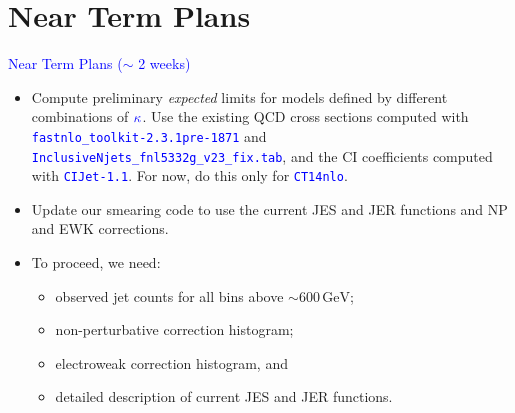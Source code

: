 \documentclass[t,professionalfonts,handout, xcolor=pdftex,dvipsnames,table]{beamer}
\newcommand{\bkappa}{\textcolor{blue}{\kappa}}
\begin{document}
\section{Near Term Plans}
\begin{frame}
\textcolor{blue}{Near Term Plans ($\sim$ 2 weeks)}
\begin{itemize}
\item Compute preliminary \emph{expected} limits for models defined by different combinations of $\bkappa$.
Use the existing QCD cross sections computed with
\textcolor{blue}{\tt fastnlo\_toolkit-2.3.1pre-1871} and \textcolor{blue}{\tt InclusiveNjets\_fnl5332g\_v23\_fix.tab},
and the CI coefficients computed with \textcolor{blue}{\tt CIJet-1.1}. For now, do this only for \textcolor{blue}{\tt CT14nlo}.
\item Update our smearing code to use the current JES and JER
functions and NP and EWK corrections. 
\item To proceed, we  need:
\begin{itemize}
	\item observed jet counts for all bins above $\sim 600\,\textrm{GeV}$;
	\item non-perturbative correction histogram;
	\item electroweak correction histogram, and
	\item detailed description of current JES and JER functions.
\end{itemize}
\end{itemize}
\end{frame}
\end{document}
